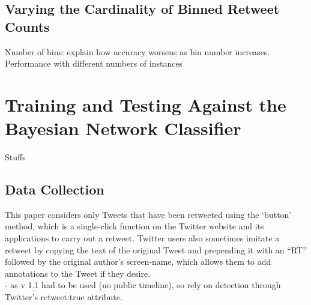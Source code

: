 \begin{enumerate}
\subsection{Varying the Cardinality of Binned Retweet Counts}

Number of bins: explain how accuracy worsens as bin number increases.
Performance with different numbers of instances




\section{Training and Testing Against the Bayesian Network Classifier}
Stuffs

\subsection{Data Collection}


This paper considers only Tweets that have been retweeted using the `button' method, which is a single-click function on the Twitter website and its applications to carry out a retweet. Twitter users also sometimes imitate a retweet by copying the text of the original Tweet and prepending it with an ``RT'' followed by the original author's screen-name, which allows them to add annotations to the Tweet if they desire.\\ 
- as v 1.1 had to be used (no public timeline), so rely on detection through Twitter's retweet:true attribute.


\end{enumerate}
